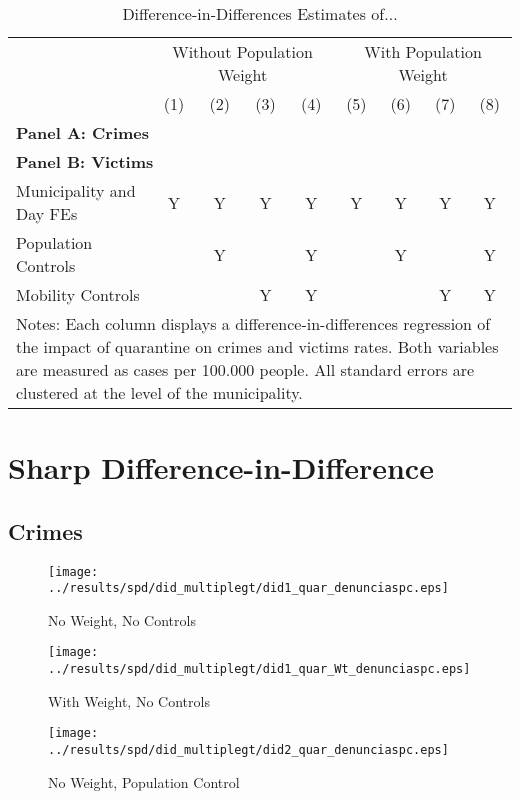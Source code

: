 \documentclass[11pt,letterpaper]{article}
\begin{document}
\begin{landscape}
  \begin{table}
    \centering
    \caption{Difference-in-Differences Estimates of...} \label{tab:DD}
    \begin{tabular}{lcccccccc} \toprule
      &\multicolumn{4}{c}{Without Population Weight}&\multicolumn{4}{c}{With Population Weight} \\ 
      \cmidrule(r){2-5}\cmidrule(r){6-9}
      &(1)&(2)&(3)&(4)&(5)&(6)&(7)&(8) \\ \midrule
      \multicolumn{9}{l}{\textbf{Panel A: Crimes}} \\
       \midrule
      \multicolumn{9}{l}{\textbf{Panel B: Victims}} \\
      
      \midrule
      Municipality and Day FEs &Y&Y&Y&Y&Y&Y&Y&Y \\
      Population Controls      & &Y& &Y& &Y& &Y \\
      Mobility Controls        & & &Y&Y& & &Y&Y \\
      \bottomrule
      \multicolumn{9}{p{21.8cm}}{{\footnotesize Notes: Each column displays a difference-in-differences regression of the impact of quarantine on crimes and victims rates. Both variables are measured as cases per 100.000 people.  All standard errors are clustered at the level of the municipality.}}
    \end{tabular}
  \end{table}
\end{landscape}

\section{Sharp Difference-in-Difference}
	\subsection{Crimes}
\begin{figure}[H]
\caption{No Weight, No Controls}
\centering
\texttt{[image: ../results/spd/did\_multiplegt/did1\_quar\_denunciaspc.eps]}
\end{figure}

\begin{figure}[H]
\caption{With Weight, No Controls}
\centering
\texttt{[image: ../results/spd/did\_multiplegt/did1\_quar\_Wt\_denunciaspc.eps]}
\end{figure}
\begin{figure}[H]
\caption{No Weight, Population Control}
\centering
\texttt{[image: ../results/spd/did\_multiplegt/did2\_quar\_denunciaspc.eps]}
\end{figure}
\end{document}
